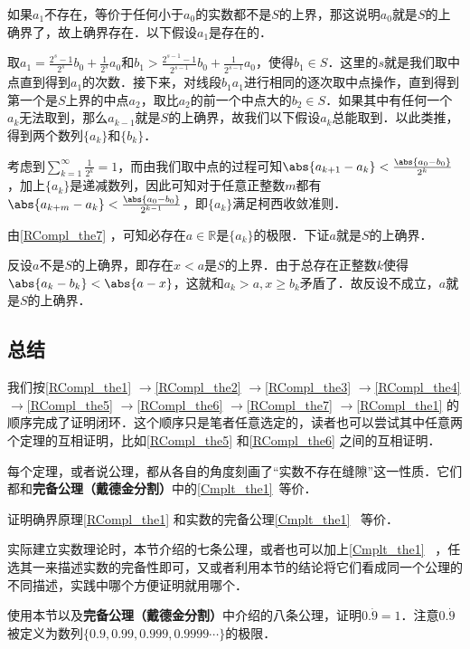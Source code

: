 如果$a_1$不存在，等价于任何小于$a_0$的实数都不是$S$的上界，那这说明$a_0$就是$S$的上确界了，故上确界存在．以下假设$a_1$是存在的．


取$a_1=\frac{2^{s}-1}{2^{s}}b_0+\frac{1}{2^{s}}a_0$和$b_1>\frac{2^{{s}-1}-1}{2^{{s}-1}}b_0+\frac{1}{2^{{s}-1}}a_0$，使得$b_1\in S$．这里的$s$就是我们取中点直到得到$a_1$的次数．接下来，对线段$b_1a_1$进行相同的逐次取中点操作，直到得到第一个是$S$上界的中点$a_2$，取比$a_2$的前一个中点大的$b_2\in S$．如果其中有任何一个$a_k$无法取到，那么$a_{k-1}$就是$S$的上确界，故我们以下假设$a_k$总能取到．以此类推，得到两个数列$\{a_k\}$和$\{b_k\}$．

考虑到$\sum\limits_{k=1}^\infty \frac{1}{2^k}=1$，而由我们取中点的过程可知$\abs{a_{k+1}-a_k}<\frac{\abs{a_0-b_0}}{2^k}$，加上$\{a_k\}$是递减数列，因此可知对于任意正整数$m$都有$\abs{a_{k+m}-a_k}<\frac{\abs{a_0-b_0}}{2^{k-1}}$，即$\{a_k\}$满足柯西收敛准则．

由\autoref{RCompl_the7} ，可知必存在$a\in\mathbb{R}$是$\{a_k\}$的极限．下证$a$就是$S$的上确界．

反设$a$不是$S$的上确界，即存在$x<a$是$S$的上界．由于总存在正整数$k$使得$\abs{a_k-b_k}<\abs{a-x}$，这就和$a_k>a, x\geq b_k$矛盾了．故反设不成立，$a$就是$S$的上确界．

\subsection{总结}

我们按\autoref{RCompl_the1} $\to$\autoref{RCompl_the2} $\to$\autoref{RCompl_the3} $\to$\autoref{RCompl_the4} $\to$\autoref{RCompl_the5} $\to$\autoref{RCompl_the6} $\to$\autoref{RCompl_the7} $\to$\autoref{RCompl_the1} 的顺序完成了证明闭环．这个顺序只是笔者任意选定的，读者也可以尝试其中任意两个定理的互相证明，比如\autoref{RCompl_the5} 和\autoref{RCompl_the6} 之间的互相证明．

每个定理，或者说公理，都从各自的角度刻画了“实数不存在缝隙”这一性质．它们都和\textbf{完备公理（戴德金分割）}中的\autoref{Cmplt_the1}~等价．

\begin{exercise}{}
证明确界原理\autoref{RCompl_the1} 和实数的完备公理\autoref{Cmplt_the1}~ 等价．
\end{exercise}

实际建立实数理论时，本节介绍的七条公理，或者也可以加上\autoref{Cmplt_the1}~ ，任选其一来描述实数的完备性即可，又或者利用本节的结论将它们看成同一个公理的不同描述，实践中哪个方便证明就用哪个．

\begin{exercise}{}
使用本节以及\textbf{完备公理（戴德金分割）}中介绍的八条公理，证明$0.\dot{9}=1$．注意$0.\dot{9}$被定义为数列$\{0.9, 0.99, 0.999, 0.9999\cdots\}$的极限．
\end{exercise}













